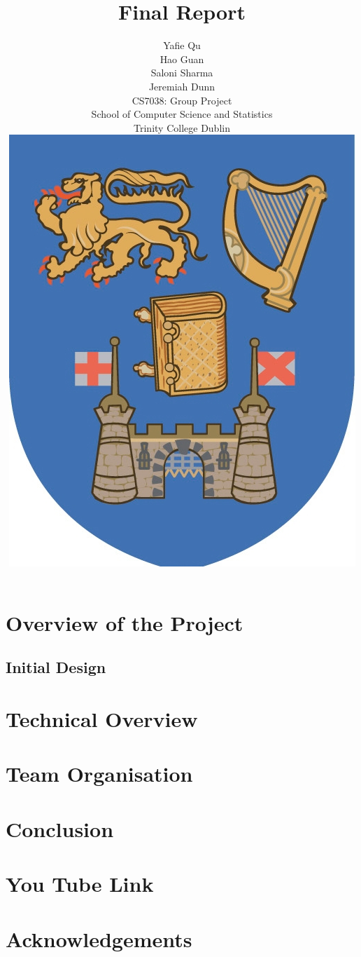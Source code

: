 \documentclass[11pt]{article}
\begin{document}
\title{Final Report}
\author{Yafie Qu\\Hao Guan\\Saloni Sharma\\Jeremiah Dunn\\CS7038: Group Project\\School of Computer Science and Statistics\\Trinity College Dublin\\\includegraphics[scale=1.5]{TCD.jpg}}
\maketitle
\section{Overview of the Project}
\subsection{Initial Design}

\section{Technical Overview}

\section{Team Organisation}

\section{Conclusion}

\section{You Tube Link}

\section{Acknowledgements}
\end{document}
